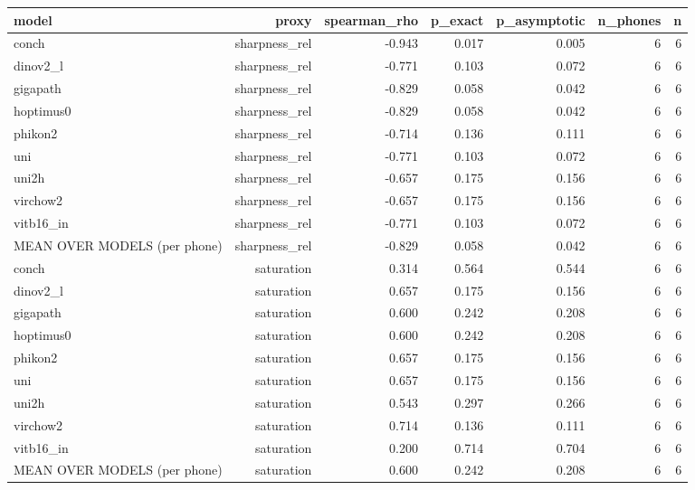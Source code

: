 \begin{table}[t]
\centering
\small
\begin{tabular}{lrrrrrr}
\toprule
model & proxy & spearman\_rho & p\_exact & p\_asymptotic & n\_phones & n \\
\midrule
conch & sharpness\_rel & -0.943 & 0.017 & 0.005 & 6 & 6 \\
dinov2_l & sharpness\_rel & -0.771 & 0.103 & 0.072 & 6 & 6 \\
gigapath & sharpness\_rel & -0.829 & 0.058 & 0.042 & 6 & 6 \\
hoptimus0 & sharpness\_rel & -0.829 & 0.058 & 0.042 & 6 & 6 \\
phikon2 & sharpness\_rel & -0.714 & 0.136 & 0.111 & 6 & 6 \\
uni & sharpness\_rel & -0.771 & 0.103 & 0.072 & 6 & 6 \\
uni2h & sharpness\_rel & -0.657 & 0.175 & 0.156 & 6 & 6 \\
virchow2 & sharpness\_rel & -0.657 & 0.175 & 0.156 & 6 & 6 \\
vitb16_in & sharpness\_rel & -0.771 & 0.103 & 0.072 & 6 & 6 \\
MEAN OVER MODELS (per phone) & sharpness\_rel & -0.829 & 0.058 & 0.042 & 6 & 6 \\
conch & saturation & 0.314 & 0.564 & 0.544 & 6 & 6 \\
dinov2_l & saturation & 0.657 & 0.175 & 0.156 & 6 & 6 \\
gigapath & saturation & 0.600 & 0.242 & 0.208 & 6 & 6 \\
hoptimus0 & saturation & 0.600 & 0.242 & 0.208 & 6 & 6 \\
phikon2 & saturation & 0.657 & 0.175 & 0.156 & 6 & 6 \\
uni & saturation & 0.657 & 0.175 & 0.156 & 6 & 6 \\
uni2h & saturation & 0.543 & 0.297 & 0.266 & 6 & 6 \\
virchow2 & saturation & 0.714 & 0.136 & 0.111 & 6 & 6 \\
vitb16_in & saturation & 0.200 & 0.714 & 0.704 & 6 & 6 \\
MEAN OVER MODELS (per phone) & saturation & 0.600 & 0.242 & 0.208 & 6 & 6 \\
\bottomrule
\end{tabular}
\end{table}
